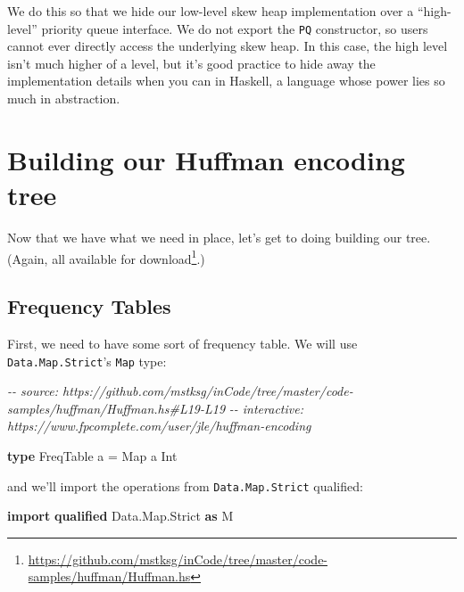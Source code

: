 \documentclass[]{article}
\newenvironment{Shaded}{}{}
\newcommand{\CommentTok}[1]{\textcolor[rgb]{0.38,0.63,0.69}{\textit{#1}}}
\newcommand{\DataTypeTok}[1]{\textcolor[rgb]{0.56,0.13,0.00}{#1}}
\newcommand{\KeywordTok}[1]{\textcolor[rgb]{0.00,0.44,0.13}{\textbf{#1}}}
\newcommand{\NormalTok}[1]{#1}
\newcommand{\OtherTok}[1]{\textcolor[rgb]{0.00,0.44,0.13}{#1}}
\renewcommand{\href}[2]{#2\footnote{\url{#1}}}
\begin{document}
We do this so that we hide our low-level skew heap implementation over a
``high-level'' priority queue interface. We do not export the \texttt{PQ}
constructor, so users cannot ever directly access the underlying skew heap. In
this case, the high level isn't much higher of a level, but it's good practice
to hide away the implementation details when you can in Haskell, a language
whose power lies so much in abstraction.

\hypertarget{building-our-huffman-encoding-tree}{%
\section{Building our Huffman encoding
tree}\label{building-our-huffman-encoding-tree}}

Now that we have what we need in place, let's get to doing building our tree.
(Again, all available
\href{https://github.com/mstksg/inCode/tree/master/code-samples/huffman/Huffman.hs}{for
download}.)

\hypertarget{frequency-tables}{%
\subsection{Frequency Tables}\label{frequency-tables}}

First, we need to have some sort of frequency table. We will use
\texttt{Data.Map.Strict}'s \texttt{Map} type:

\begin{Shaded}
\begin{Highlighting}[]
\CommentTok{{-}{-} source: https://github.com/mstksg/inCode/tree/master/code{-}samples/huffman/Huffman.hs\#L19{-}L19}
\CommentTok{{-}{-} interactive: https://www.fpcomplete.com/user/jle/huffman{-}encoding}

\KeywordTok{type} \DataTypeTok{FreqTable}\NormalTok{ a }\OtherTok{=} \DataTypeTok{Map}\NormalTok{ a }\DataTypeTok{Int}
\end{Highlighting}
\end{Shaded}

and we'll import the operations from \texttt{Data.Map.Strict} qualified:

\begin{Shaded}
\begin{Highlighting}[]
\KeywordTok{import} \KeywordTok{qualified} \DataTypeTok{Data.Map.Strict} \KeywordTok{as} \DataTypeTok{M}
\end{Highlighting}
\end{Shaded}
\end{document}
